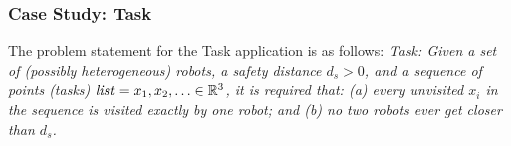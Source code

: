 

\newcommand{\Task}{\textsf{Task}\xspace}

\subsubsection*{Case Study: \Task}
The problem statement for the \Task application is as follows: {\small \em \Task: Given a set of (possibly heterogeneous) robots, a safety distance $d_s>0$, and a sequence of points (tasks) $\mathit{list} = x_1, x_2, \ldots \in \reals^3$, it is required that: (a) every unvisited $x_i$ in the sequence is {\em visited\/} exactly by one robot; and (b) no two robots ever get closer than $d_s$.\/}

